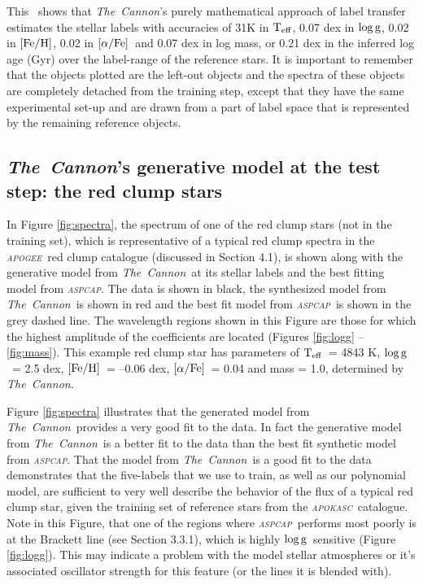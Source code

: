 \documentclass[12pt, preprint]{aastex}
\newcommand{\project}[1]{\textsl{#1}}
\newcommand{\tc}{\project{The~Cannon}}
\newcommand{\apogee}{\project{\textsc{apogee}}}
\newcommand{\apokasc}{\project{\textsc{apokasc}}}
\newcommand{\aspcap}{\project{\textsc{aspcap}}}
\newcommand{\teff}{\mbox{$\rm T_{eff}$}}
\newcommand{\feh}{\mbox{$\rm [Fe/H]$}}
\newcommand{\alphafe}{\mbox{$\rm [\alpha/Fe]$}}
\newcommand{\logg}{\mbox{$\rm \log g$}}
\begin{document}
This \figurename\ shows that \tc 's purely mathematical approach of label transfer estimates the stellar labels with accuracies of 31K in \teff, 0.07 dex in \logg, 0.02 in \feh, 0.02 in \alphafe\ and  0.07 dex in log mass, or 0.21 dex in the inferred log age (Gyr) over the label-range of the reference stars. It is important to remember that the objects plotted are the left-out objects and the spectra of these objects are completely detached from the training step,  except that they have the same experimental set-up and are drawn from a part of label space that is represented by the remaining reference objects.


\subsection{\tc's generative model at the test step: the red clump stars}


In Figure \ref{fig:spectra}, the spectrum of one of the red clump stars (not in the training set), which is representative of a typical red clump spectra in the \apogee\ red clump catalogue (discussed in Section 4.1), is shown along with the generative model from \tc\ at its stellar labels and the best fitting model from \aspcap. The data is shown in black, the synthesized model from \tc\ is shown in red and the best fit model from \aspcap\ is shown in the grey dashed line. The wavelength regions shown in this Figure are those for which the highest amplitude of the coefficients are located (Figures \ref{fig:logg} -- \ref{fig:mass}).  This example red clump star has parameters of \teff\ = 4843 K, \logg\ = 2.5 dex, \feh\ = --0.06 dex, \alphafe\ = 0.04 and mass = 1.0, determined by \tc. 


Figure \ref{fig:spectra} illustrates that the generated model from \tc\ provides a very good fit to the data. In fact the generative model from \tc\ is a better fit to the data than the best fit synthetic model from \aspcap. That the model from \tc\ is a good fit to the data demonstrates that the five-labels that we use to train, as well as our polynomial model, are sufficient to very well describe the behavior of the flux of a typical red clump star, given the training set of reference stars from the \apokasc\ catalogue. Note in this Figure, that one of the regions where \aspcap\ performs most poorly is at the Brackett line (see Section 3.3.1), which is highly \logg\ sensitive (Figure \ref{fig:logg}). This may indicate a problem with the model stellar atmospheres or it's associated oscillator strength for this feature (or the lines it is blended with). 
\end{document}
